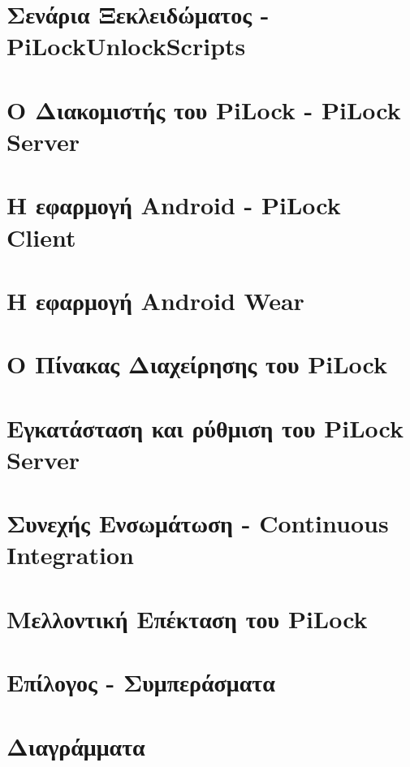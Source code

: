 \documentclass[12pt]{report}
\begin{document}
    \chapter{Σενάρια Ξεκλειδώματος - PiLockUnlockScripts}
    

    \chapter{Ο Διακομιστής του PiLock - PiLock Server}
    

    \chapter{Η εφαρμογή Android - PiLock Client}
    

    \chapter{Η εφαρμογή Αndroid Wear}
    

    \chapter{Ο Πίνακας Διαχείρησης του PiLock}
    

    \chapter{Εγκατάσταση και ρύθμιση του PiLock Server}
    

    \chapter{Συνεχής Ενσωμάτωση - Continuous Integration}
    

    \chapter{Μελλοντική Επέκταση του PiLock}
    

    \chapter{Επίλογος - Συμπεράσματα}
    

    \appendix
    \chapter{Διαγράμματα}
    

    

    \printindex
    
\end{document}
